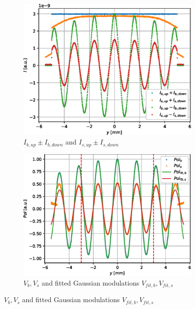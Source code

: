 \begin{figure}[htbp]
	\centering
	\begin{subfigure}[b]{0.45\textwidth}
		\centering
		\includegraphics[width=\textwidth]{simulation-raw-intensity-differential}
		\caption{$I_{b,up} \pm I_{b,down}$ and $I_{s,up} \pm I_{s,down}$}
		\label{fig:simulation-raw-intensity-differential}
	\end{subfigure}
	\hfill
	\begin{subfigure}[b]{0.45\textwidth}
		\centering
		\includegraphics[width=\textwidth]{simulation-raw-intensity-pol}
		\caption{$V_b, V_s$ and fitted Gaussian modulations $V_{fit,b}, V_{fit,s}$}
		\label{fig:simulation-raw-intensity-pol}
	\end{subfigure}

\end{figure}
